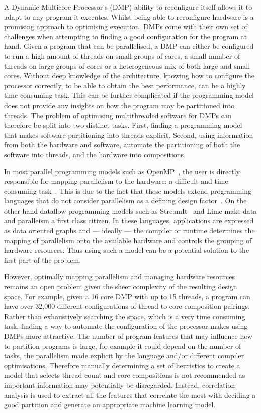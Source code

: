 A Dynamic Multicore Processor's (DMP) ability to reconfigure itself allows it to adapt to any program it executes.
Whilst being able to reconfigure hardware is a promising approach to optimising execution, DMPs come with their own set of challenges when attempting to finding a good configuration for the program at hand.
Given a program that can be parallelised, a DMP can either be configured to run a high amount of threads on small groups of cores, a small number of threads on large groups of cores or a heterogeneous mix of both large and small cores.
Without deep knowledge of the architecture, knowing how to configure the processor correctly, to be able to obtain the best performance, can be a highly time consuming task.
This can be further complicated if the programming model does not provide any insights on how the program may be partitioned into threads.
The problem of optimising multithreaded software for DMPs can therefore be split into two distinct tasks.
First, finding a programming model that makes software partitioning into threads explicit.
Second, using information from both the hardware and software, automate the partitioning of both the software into threads, and the hardware into compositions.

In most parallel programming models such as OpenMP~\cite{openmp}, the user is directly responsible for mapping parallelism to the hardware; a difficult and time consuming task~\cite{prabhu2011LanguagePar}.
This is due to the fact that these models extend programming languages that do not consider parallelism as a defining design factor~\cite{pingaliTao2011}.
On the other-hand dataflow programming models such as StreamIt~\cite{theis2002streamit} and Lime \cite{auerbach2012lime} make data and paralleism a first class citizen.
In these languages, applications are expressed as data oriented graphs and --- ideally --- the compiler or runtime determines the mapping of parallelism onto the available hardware and controls the grouping of hardware resources.
Thus using such a model can be a potential solution to the first part of the problem.

However, optimally mapping parallelism and managing hardware resources remains an open problem given the sheer complexity of the resulting design space.
For example, given a 16 core DMP with up to 15 threads, a program can have over 32,000 different configurations of thread to core composition pairings.
Rather than exhaustively searching the space, which is a very time consuming task, finding a way to automate the configuration of the processor makes using DMPs more attractive.
The number of program features that may influence how to partition programs is large, for example it could depend on the number of tasks, the parallelism made explicit by the language and/or different compiler optimisations.
Therefore manually determining a set of heuristics to create a model that selects thread count and core compositions is not recommended as important information may potentially be disregarded.
Instead, correlation analysis is used to extract all the features that correlate the most with deciding a good partition and generate an appropriate machine learning model.

